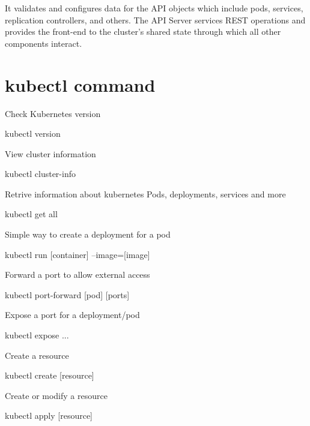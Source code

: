 \documentclass{refcard}
\begin{document}
It validates and configures data for the API objects which include pods, services, replication controllers, and others. The API Server services REST operations and provides the front-end to the cluster's shared state through which all other components interact.\\

\section{kubectl command}

Check Kubernetes version
\begin{ttyenv}
kubectl version
\end{ttyenv}

View cluster information
\begin{ttyenv}
kubectl cluster-info
\end{ttyenv}

Retrive information about kubernetes Pods, deployments, services and more
\begin{ttyenv}
kubectl get all
\end{ttyenv}

Simple way to create a deployment for a pod
\begin{ttyenv}
kubectl run [container] --image=[image]
\end{ttyenv}

Forward a port to allow external access
\begin{ttyenv}
kubectl port-forward [pod] [ports]
\end{ttyenv}

Expose a port for a deployment/pod
\begin{ttyenv}
kubectl expose ...
\end{ttyenv}

Create a resource
\begin{ttyenv}
kubectl create [resource]
\end{ttyenv}

Create or modify a resource
\begin{ttyenv}
kubectl apply [resource]
\end{ttyenv}




\rflicense
\end{document}
